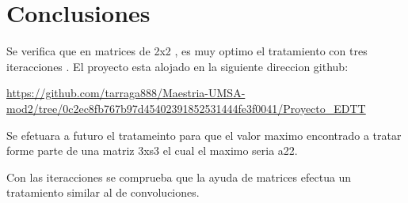 \documentclass[Spanish,12pt,doublespace,german,letterpaper]{article}
\begin{document}
\section{Conclusiones}
Se verifica que en matrices de 2x2 , es muy optimo el tratamiento con tres iteracciones .
El proyecto esta alojado en la siguiente direccion github:


\url{https://github.com/tarraga888/Maestria-UMSA-mod2/tree/0c2ec8fb767b97d45402391852531444fe3f0041/Proyecto_EDTT}


Se efetuara a futuro el tratameinto para que el valor maximo encontrado a tratar forme parte de una matriz 3xs3  el cual el maximo seria a22.

Con las iteracciones se comprueba que la ayuda de matrices efectua un tratamiento similar al de convoluciones.
\end{document}
